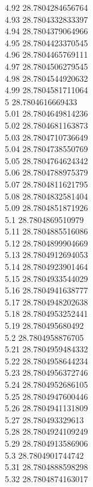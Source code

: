 {4.92	28.7804284656764\\
4.93	28.7804332833397\\
4.94	28.7804379064966\\
4.95	28.7804423370545\\
4.96	28.7804465769111\\
4.97	28.7804506279545\\
4.98	28.7804544920632\\
4.99	28.7804581711064\\
5	28.7804616669433\\
5.01	28.7804649814236\\
5.02	28.7804681163873\\
5.03	28.7804710736649\\
5.04	28.7804738550769\\
5.05	28.7804764624342\\
5.06	28.7804788975379\\
5.07	28.7804811621795\\
5.08	28.7804832581404\\
5.09	28.7804851871926\\
5.1	28.7804869510979\\
5.11	28.7804885516086\\
5.12	28.7804899904669\\
5.13	28.7804912694053\\
5.14	28.7804923901464\\
5.15	28.7804933544029\\
5.16	28.7804941638777\\
5.17	28.7804948202638\\
5.18	28.7804953252441\\
5.19	28.780495680492\\
5.2	28.7804958876705\\
5.21	28.7804959484332\\
5.22	28.7804958644234\\
5.23	28.7804956372746\\
5.24	28.7804952686105\\
5.25	28.7804947600446\\
5.26	28.7804941131809\\
5.27	28.780493329613\\
5.28	28.7804924109249\\
5.29	28.7804913586906\\
5.3	28.7804901744742\\
5.31	28.7804888598298\\
5.32	28.7804874163017\\
}
